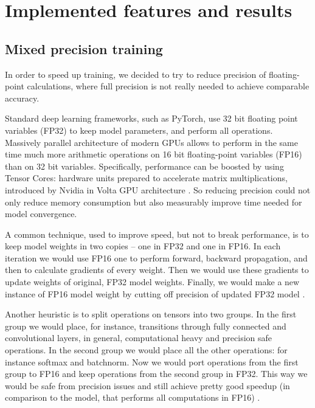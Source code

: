 \documentclass[licencjacka,en]{pracamgr}
\begin{document}
    \chapter{Implemented features and results}\label{r:results}
    
    
    
    
    
    
    
    
    
    
    
    	\section{Mixed precision training}
	In order to speed up training, we decided to try to reduce precision of floating-point calculations, where full precision is not really needed to achieve comparable accuracy.
	
	Standard deep learning frameworks, such as PyTorch, use 32 bit floating point variables (FP32) to keep model parameters, and perform all operations. Massively parallel architecture of modern GPUs allows to perform in the same time much more arithmetic operations on 16 bit floating-point variables (FP16) than on 32 bit variables.
	Specifically, performance can be boosted by using Tensor Cores: hardware units prepared to accelerate matrix multiplications, introduced by Nvidia in Volta GPU architecture \cite{MPT}.
	So reducing precision could not only reduce memory consumption but also measurably improve time needed for model convergence.
	
	A common technique, used to improve speed, but not to break performance, is to keep model weights in two copies -- one in FP32 and one in FP16. In each iteration we would use FP16 one to perform forward, backward propagation, and then to calculate gradients of every weight. Then we would use these gradients to update weights of original, FP32 model weights. Finally, we would make a new instance of FP16 model weight by cutting off precision of updated FP32 model \cite{APEX}.
	
	Another heuristic is to split operations on tensors into two groups. In the first group we would place, for instance, transitions through fully connected and convolutional layers, in general, computational heavy and precision safe operations. In the second group we would place all the other operations: for instance softmax and batchnorm. Now we would port operations from the first group to FP16 and keep operations from the second group in FP32. This way we would be safe from precision issues and still achieve pretty good speedup (in comparison to the model, that performs all computations in FP16) \cite{APEX}.
	
\end{document}
